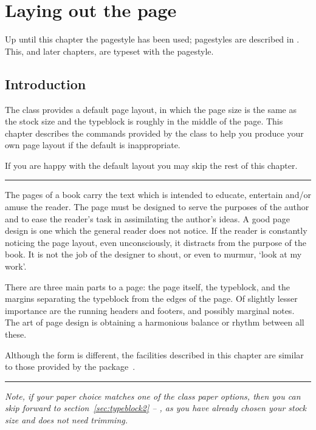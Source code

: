 \chapter{Laying out the page} \label{chap:layingpage}

Up until this chapter the  pagestyle
has been used; pagestyles are described in .
This, and later chapters, are typeset with the  pagestyle.

\section{Introduction}

    The class provides a default page 
layout, 
in which the page size is the
same as the stock size and the typeblock is 
roughly in the middle of the page.
    This chapter describes the commands provided by the class to help you
produce your own page layout if the default is inappropriate.

    If you are happy with the default layout you may skip the rest of this
chapter.

\fancybreak{}

    The pages of a book carry the text which is intended to educate, entertain
and/or amuse the reader. The page must be designed to serve the purposes of
the author and to ease the reader's task in assimilating the author's ideas.
A good page design is one which the general reader does not notice. If the
reader is constantly noticing the page layout, even unconsciously, it distracts
from the purpose of the book. It is not the job of the designer to 
shout, or even to murmur, `look at my work'.

    There are three main parts to a page: the page itself, the 
typeblock, and 
the margins separating the typeblock from 
the edges of the page. Of slightly lesser importance are the running 
headers and footers, 
and possibly marginal notes.
The art of page design is obtaining a harmonious balance or rhythm between
all these.

    Although the form is different, the facilities described in this chapter 
are similar to those provided by the  
package~\cite{GEOMETRY}.

\fancybreak{}

\begin{adjustwidth}{3em}{3em}
  \itshape
  Note, if your paper choice matches one of the class paper options,
  then you can skip forward to section~\ref{sec:typeblock2} --
  \emph{}, as you have already chosen your
  stock size and does not need trimming.
\end{adjustwidth}

